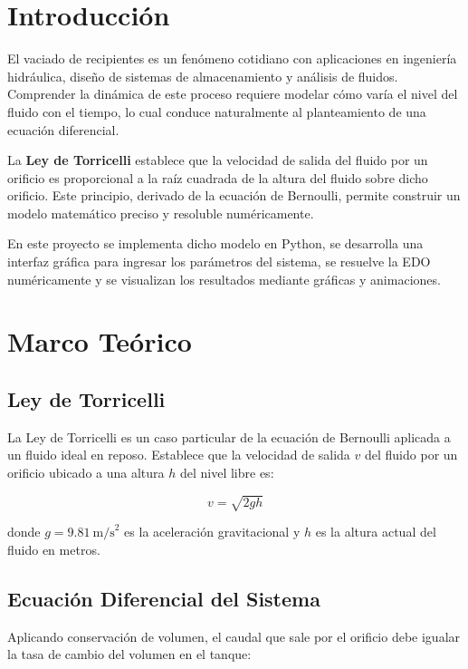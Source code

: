 \documentclass[12pt, a4paper]{article}
\begin{document}
\section{Introducción}

El vaciado de recipientes es un fenómeno cotidiano con aplicaciones en ingeniería
hidráulica, diseño de sistemas de almacenamiento y análisis de fluidos. Comprender
la dinámica de este proceso requiere modelar cómo varía el nivel del fluido con
el tiempo, lo cual conduce naturalmente al planteamiento de una ecuación diferencial.

La \textbf{Ley de Torricelli} establece que la velocidad de salida del fluido por
un orificio es proporcional a la raíz cuadrada de la altura del fluido sobre dicho
orificio. Este principio, derivado de la ecuación de Bernoulli, permite construir
un modelo matemático preciso y resoluble numéricamente.

En este proyecto se implementa dicho modelo en Python, se desarrolla una interfaz
gráfica para ingresar los parámetros del sistema, se resuelve la EDO numéricamente
y se visualizan los resultados mediante gráficas y animaciones.

\section{Marco Teórico}

\subsection{Ley de Torricelli}

La Ley de Torricelli es un caso particular de la ecuación de Bernoulli aplicada
a un fluido ideal en reposo. Establece que la velocidad de salida $v$ del fluido
por un orificio ubicado a una altura $h$ del nivel libre es:

\begin{equation}
    v = \sqrt{2gh}
\end{equation}

donde $g = 9.81\ \text{m/s}^2$ es la aceleración gravitacional y $h$ es la
altura actual del fluido en metros.

\subsection{Ecuación Diferencial del Sistema}

Aplicando conservación de volumen, el caudal que sale por el orificio debe
igualar la tasa de cambio del volumen en el tanque:
\end{document}
